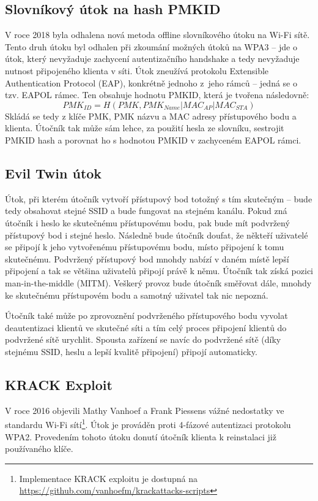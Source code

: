 \subsection{Slovníkový útok na hash PMKID}
V roce 2018 byla odhalena nová metoda offline slovníkového útoku na Wi-Fi sítě. Tento druh útoku byl odhalen při zkoumání možných útoků na WPA3 -- jde o útok, který nevyžaduje zachycení autentizačního handshake a tedy nevyžaduje nutnost připojeného klienta v síti. Útok zneužívá protokolu Extensible Authentication Protocol (EAP), konkrétně jednoho z~jeho rámců -- jedná se o tzv. EAPOL rámec. Ten obsahuje hodnotu PMKID, která je tvořena následovně:
\begin{equation}
PMK_{ID}=H(PMK,PMK_{Name}|MAC_{AP}|MAC_{STA})
\end{equation}
Skládá se tedy z klíče PMK, PMK názvu a MAC adresy přístupového bodu a klienta. Útočník tak může sám lehce, za použití hesla ze slovníku, sestrojit PMKID hash a porovnat ho s hodnotou PMKID v zachyceném EAPOL rámci. 

\subsection{Evil Twin útok}
Útok, při kterém útočník vytvoří přístupový bod totožný s tím skutečným -- bude tedy obsahovat stejné SSID a bude fungovat na stejném kanálu. Pokud zná útočník i heslo ke skutečnému přístupovému bodu, pak bude mít podvržený přístupový bod i stejné heslo. Následně bude útočník doufat, že někteří uživatelé se připojí k jeho vytvořenému přístupovému bodu, místo připojení k tomu skutečnému. Podvržený přístupový bod mnohdy nabízí v daném místě lepší připojení a tak se většina uživatelů připojí právě k němu. Útočník tak získá pozici man-in-the-middle (MITM). Veškerý provoz bude útočník směřovat dále, mnohdy ke skutečnému přístupovém bodu a samotný uživatel tak nic nepozná. 

Útočník také může po zprovoznění podvrženého přístupového bodu vyvolat deautentizaci klientů ve skutečné síti a tím celý proces připojení klientů do podvržené sítě urychlit. Spousta zařízení se navíc do podvržené sítě (díky stejnému SSID, heslu a lepší kvalitě připojení) připojí automaticky. 

\subsection{KRACK Exploit}
V roce 2016 objevili Mathy Vanhoef a Frank Piessens vážné nedostatky ve standardu Wi-Fi sítí\footnote{Implementace KRACK exploitu je dostupná na \url{https://github.com/vanhoefm/krackattacks-scripts}}. Útok je prováděn proti 4-fázové autentizaci protokolu WPA2. Provedením tohoto útoku donutí útočník klienta k reinstalaci již používaného klíče. 

